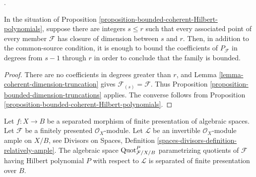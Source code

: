 \begin{lemma}
\label{corollary-bounded-associated-dimensions}
\begin{reference}
\cite[Expos\'e 221, Corollary 2.3, p. 255]{FGA}.
\end{reference}
In the situation of Proposition
\ref{proposition-bounded-coherent-Hilbert-polynomials}, suppose there are
integers $s\leq r$ such that every associated point of every member
$\mathcal{F}$ has closure of dimension between $s$ and $r$. Then, in addition
to the common-source condition, it is enough to bound the coefficients of
$P_{\mathcal{F}}$ in degrees from $s-1$ through $r$ in order to conclude that
the family is bounded.
\end{lemma}

\begin{proof}
There are no coefficients in degrees greater than $r$, and Lemma
\ref{lemma-coherent-dimension-truncation} gives
$\mathcal{F}_{(s)}=\mathcal{F}$. Thus Proposition
\ref{proposition-bounded-dimension-truncations} applies. The converse follows
from Proposition \ref{proposition-bounded-coherent-Hilbert-polynomials}.
\end{proof}


\begin{lemma}
\label{lemma-quot-qc-over-base}
Let $f : X \to B$ be a separated morphism of finite presentation
of algebraic spaces. Let $\mathcal{F}$ be a finitely presented
$\mathcal{O}_X$-module. Let $\mathcal{L}$ be an invertible
$\mathcal{O}_X$-module ample on $X/B$, see
Divisors on Spaces, Definition
\ref{spaces-divisors-definition-relatively-ample}.
The algebraic space $\mathrm{Quot}^P_{\mathcal{F}/X/B}$
parametrizing quotients of $\mathcal{F}$
having Hilbert polynomial $P$ with respect to $\mathcal{L}$
is separated of finite presentation over $B$.
\end{lemma}

